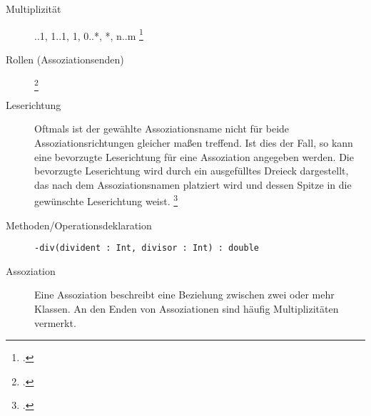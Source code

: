 \documentclass{bschlangaul-theorie}
\begin{document}
\begin{description}
\begin{center}
\end{center}

%

\item[Multiplizität]
..1, 1..1, 1, 0..*, *, n..m
\footcite[Seite 98 (PDF 115)]{uml}

%

\item[Rollen (Assoziationsenden)]
\footcite[Seite 145]{rupp}

\begin{center}
\end{center}

\item[Leserichtung]

Oftmals ist der gewählte Assoziationsname nicht für beide
Assoziationsrichtungen gleicher­ maßen treffend. Ist dies der Fall, so
kann eine bevorzugte Leserichtung für eine Assoziation angegeben werden.
Die bevorzugte Leserichtung wird durch ein ausgefülltes Dreieck
darge­stellt, das nach dem Assoziationsnamen platziert wird und dessen
Spitze in die gewünschte Leserichtung weist.
\footcite[Seite 144]{rupp}

\begin{center}
\end{center}

%

\item[Methoden/Operationsdeklaration]
\zB \verb|-div(divident : Int, divisor : Int) : double|

%

\item[Assoziation] Eine Assoziation beschreibt eine Beziehung zwischen
zwei oder mehr Klassen. An den Enden von Assoziationen sind häufig
Multiplizitäten vermerkt. 


\end{description}
\end{document}
